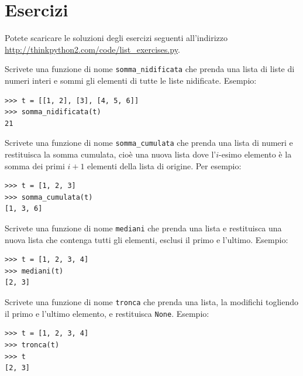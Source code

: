 \documentclass[10pt]{book}
\begin{document}
\section{Esercizi}

Potete scaricare le soluzioni degli esercizi seguenti all'indirizzo
\url{http://thinkpython2.com/code/list_exercises.py}.

\vspace{0.2in}
\begin{exercise}

Scrivete una funzione di nome \verb"somma_nidificata" che prenda una lista di liste di numeri interi e sommi gli elementi di tutte le liste nidificate.
Esempio:

\begin{verbatim}
>>> t = [[1, 2], [3], [4, 5, 6]]
>>> somma_nidificata(t)
21
\end{verbatim}

\end{exercise}

\vspace{0.2in}
\begin{exercise}
\label{cumulative}

Scrivete una funzione di nome \verb"somma_cumulata" che prenda una lista di numeri e restituisca la somma cumulata, cioè una nuova lista dove l'$i$-esimo elemento è la somma dei primi $i+1$ elementi della lista di origine. Per esempio:

\begin{verbatim}
>>> t = [1, 2, 3]
>>> somma_cumulata(t)
[1, 3, 6]
\end{verbatim}

\end{exercise}

\vspace{0.2in}
\begin{exercise}

Scrivete una funzione di nome \verb"mediani" che prenda una lista e restituisca una nuova lista che contenga tutti gli elementi, esclusi il primo e l'ultimo.
Esempio:

\begin{verbatim}
>>> t = [1, 2, 3, 4]
>>> mediani(t)
[2, 3]
\end{verbatim}

\end{exercise}

\vspace{0.2in}
\begin{exercise}

Scrivete una funzione di nome \verb"tronca" che prenda una lista, la modifichi togliendo il primo e l'ultimo elemento, e restituisca {\tt None}.
Esempio:

\begin{verbatim}
>>> t = [1, 2, 3, 4]
>>> tronca(t)
>>> t
[2, 3]
\end{verbatim}
\end{exercise}
\end{document}

